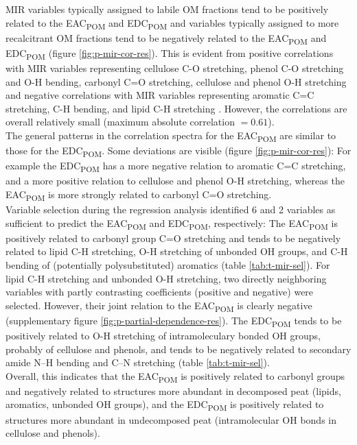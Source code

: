 \documentclass[alpha-refs]{wiley-article-rmd}
\begin{document}
\begin{refsection}
MIR variables typically assigned to labile OM fractions tend to be positively related to the EAC\textsubscript{POM} and EDC\textsubscript{POM} and variables typically assigned to more recalcitrant OM fractions tend to be negatively related to the EAC\textsubscript{POM} and EDC\textsubscript{POM} (figure \ref{fig:p-mir-cor-res}). This is evident from positive correlations with MIR variables representing cellulose C-O stretching, phenol C-O stretching and O-H bending, carbonyl C=O stretching, cellulose and phenol O-H stretching and negative correlations with MIR variables representing aromatic C=C stretching, C-H bending, and lipid C-H stretching \autocite{Stuart.2005,Cocozza.2003,Artz.2008,Kubo.2005,Schmidt.2006}. However, the correlations are overall relatively small (maximum absolute correlation \(=0.61\)).\\
The general patterns in the correlation spectra for the EAC\textsubscript{POM} are similar to those for the EDC\textsubscript{POM}. Some deviations are visible (figure \ref{fig:p-mir-cor-res}): For example the EDC\textsubscript{POM} has a more negative relation to aromatic C=C stretching, and a more positive relation to cellulose and phenol O-H stretching, whereas the EAC\textsubscript{POM} is more strongly related to carbonyl C=O stretching.\\
Variable selection during the regression analysis identified 6 and 2 variables as sufficient to predict the EAC\textsubscript{POM} and EDC\textsubscript{POM}, respectively: The EAC\textsubscript{POM} is positively related to carbonyl group C=O stretching and tends to be negatively related to lipid C-H stretching, O-H stretching of unbonded OH groups, and C-H bending of (potentially polysubstituted) aromatics (table \ref{tab:t-mir-sel}). For lipid C-H stretching and unbonded O-H stretching, two directly neighboring variables with partly contrasting coefficients (positive and negative) were selected. However, their joint relation to the EAC\textsubscript{POM} is clearly negative (supplementary figure \ref{fig:p-partial-dependence-res}). The EDC\textsubscript{POM} tends to be positively related to O-H stretching of intramoleculary bonded OH groups, probably of cellulose and phenols, and tends to be negatively related to secondary amide N--H bending and C--N stretching (table \ref{tab:t-mir-sel}).\\
Overall, this indicates that the EAC\textsubscript{POM} is positively related to carbonyl groups and negatively related to structures more abundant in decomposed peat (lipids, aromatics, unbonded OH groups), and the EDC\textsubscript{POM} is positively related to structures more abundant in undecomposed peat (intramolecular OH bonds in cellulose and phenols).


\end{refsection}
\end{document}
